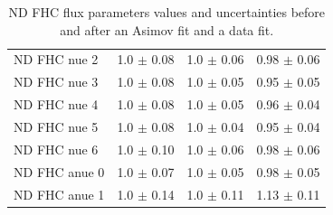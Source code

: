 \begin{table}[ht!]
\begin{tabular}{llll}
    \Gls{ND} \Gls{FHC} \Gls{nue} 2 & 1.0 $\pm$ 0.08 & 1.0 $\pm$ 0.06 & 0.98 $\pm$ 0.06 \\ 
    \Gls{ND} \Gls{FHC} \Gls{nue} 3 & 1.0 $\pm$ 0.08 & 1.0 $\pm$ 0.05 & 0.95 $\pm$ 0.05 \\ 
    \Gls{ND} \Gls{FHC} \Gls{nue} 4 & 1.0 $\pm$ 0.08 & 1.0 $\pm$ 0.05 & 0.96 $\pm$ 0.04 \\ 
    \Gls{ND} \Gls{FHC} \Gls{nue} 5 & 1.0 $\pm$ 0.08 & 1.0 $\pm$ 0.04 & 0.95 $\pm$ 0.04 \\ 
    \Gls{ND} \Gls{FHC} \Gls{nue} 6 & 1.0 $\pm$ 0.10 & 1.0 $\pm$ 0.06 & 0.98 $\pm$ 0.06 \\ 
    \Gls{ND} \Gls{FHC} \Gls{anue} 0& 1.0 $\pm$ 0.07 & 1.0 $\pm$ 0.05 & 0.98 $\pm$ 0.05 \\ 
    \Gls{ND} \Gls{FHC} \Gls{anue} 1& 1.0 $\pm$ 0.14 & 1.0 $\pm$ 0.11 & 1.13 $\pm$ 0.11 \\
    \bottomrule
  \end{tabular}
  \caption{\Gls{ND} \Gls{FHC} flux parameters values and uncertainties
    before and after an \Gls{Asimov} fit and a data fit.}
\end{table}
